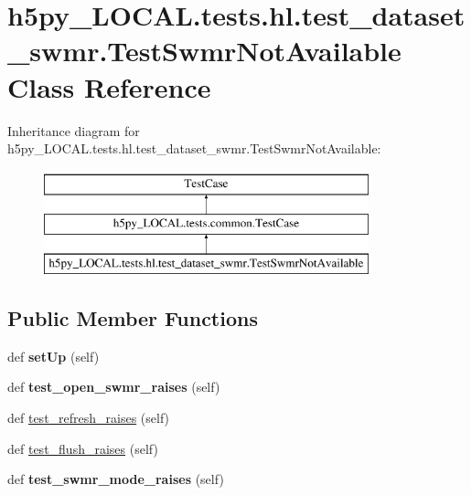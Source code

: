 \hypertarget{classh5py__LOCAL_1_1tests_1_1hl_1_1test__dataset__swmr_1_1TestSwmrNotAvailable}{}\section{h5py\+\_\+\+L\+O\+C\+A\+L.\+tests.\+hl.\+test\+\_\+dataset\+\_\+swmr.\+Test\+Swmr\+Not\+Available Class Reference}
\label{classh5py__LOCAL_1_1tests_1_1hl_1_1test__dataset__swmr_1_1TestSwmrNotAvailable}
Inheritance diagram for h5py\+\_\+\+L\+O\+C\+A\+L.\+tests.\+hl.\+test\+\_\+dataset\+\_\+swmr.\+Test\+Swmr\+Not\+Available\+:\begin{figure}[H]
\begin{center}
\leavevmode
\includegraphics[height=3.000000cm]{classh5py__LOCAL_1_1tests_1_1hl_1_1test__dataset__swmr_1_1TestSwmrNotAvailable}
\end{center}
\end{figure}
\subsection*{Public Member Functions}
\begin{DoxyCompactItemize}
\item 
\mbox{\label{classh5py__LOCAL_1_1tests_1_1hl_1_1test__dataset__swmr_1_1TestSwmrNotAvailable_ab0c52d3ece188aef0a096ec5075c9aa8}} 
def {\bfseries set\+Up} (self)
\item 
\mbox{\label{classh5py__LOCAL_1_1tests_1_1hl_1_1test__dataset__swmr_1_1TestSwmrNotAvailable_ae4491978ebb23b82c9e819b2d48407a8}} 
def {\bfseries test\+\_\+open\+\_\+swmr\+\_\+raises} (self)
\item 
def \hyperlink{classh5py__LOCAL_1_1tests_1_1hl_1_1test__dataset__swmr_1_1TestSwmrNotAvailable_a712cac7776ebb269de1eba50e865ae22}{test\+\_\+refresh\+\_\+raises} (self)
\item 
def \hyperlink{classh5py__LOCAL_1_1tests_1_1hl_1_1test__dataset__swmr_1_1TestSwmrNotAvailable_af234fa449a4e5682d870112f804282a5}{test\+\_\+flush\+\_\+raises} (self)
\item 
\mbox{\label{classh5py__LOCAL_1_1tests_1_1hl_1_1test__dataset__swmr_1_1TestSwmrNotAvailable_ad62c1487d64286a9bb31376c3eb2f4b3}} 
def {\bfseries test\+\_\+swmr\+\_\+mode\+\_\+raises} (self)
\end{DoxyCompactItemize}
